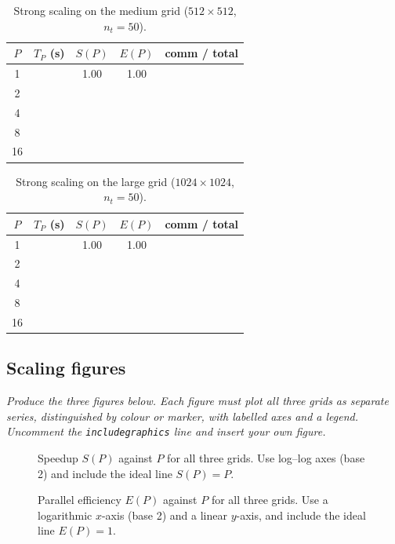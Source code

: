 \documentclass[11pt]{article}
\newcommand{\prompt}[1]{{\itshape\color{gray}#1\par}\medskip}
\begin{document}
\begin{table}[H]
\centering
\begin{tabular}{@{}ccccc@{}}
\toprule
$P$ & $T_P$ (s) & $S(P)$ & $E(P)$ & comm / total \\
\midrule
1  & & 1.00 & 1.00 & \\
2  & & & & \\
4  & & & & \\
8  & & & & \\
16 & & & & \\
\bottomrule
\end{tabular}
\caption{Strong scaling on the medium grid ($512 \times 512$, $n_t = 50$).}
\label{tab:medium}
\end{table}

\begin{table}[H]
\centering
\begin{tabular}{@{}ccccc@{}}
\toprule
$P$ & $T_P$ (s) & $S(P)$ & $E(P)$ & comm / total \\
\midrule
1  & & 1.00 & 1.00 & \\
2  & & & & \\
4  & & & & \\
8  & & & & \\
16 & & & & \\
\bottomrule
\end{tabular}
\caption{Strong scaling on the large grid ($1024 \times 1024$, $n_t = 50$).}
\label{tab:large}
\end{table}

\subsection*{Scaling figures}

\prompt{Produce the three figures below. Each figure must plot all three grids as separate series,
distinguished by colour or marker, with labelled axes and a legend. Uncomment the
\texttt{includegraphics} line and insert your own figure.}

\begin{figure}[H]
    \centering
    \caption{Speedup $S(P)$ against $P$ for all three grids. Use log--log axes (base 2) and include
    the ideal line $S(P) = P$.}
    \label{fig:speedup}
\end{figure}

\begin{figure}[H]
    \centering
    \caption{Parallel efficiency $E(P)$ against $P$ for all three grids. Use a logarithmic $x$-axis
    (base 2) and a linear $y$-axis, and include the ideal line $E(P) = 1$.}
    \label{fig:efficiency}
\end{figure}
\end{document}
